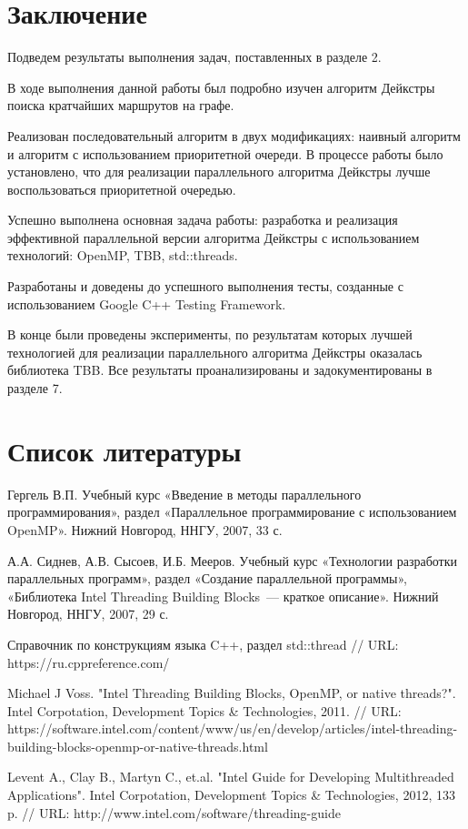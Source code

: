 \documentclass{article}
\begin{document}
\newpage

\section{Заключение}
Подведем результаты выполнения задач, поставленных в разделе 2.

\par В ходе выполнения данной работы был подробно изучен алгоритм Дейкстры поиска кратчайших маршрутов на графе. 

\par Реализован последовательный алгоритм в двух модификациях: наивный алгоритм и алгоритм с использованием приоритетной очереди. В процессе работы было установлено, что для реализации параллельного алгоритма Дейкстры лучше воспользоваться приоритетной очередью.

\par Успешно выполнена основная задача работы: разработка и реализация эффективной параллельной версии алгоритма Дейкстры с использованием технологий: OpenMP, TBB, std::threads.

\par Разработаны и доведены до успешного выполнения тесты, созданные с использованием Google C++ Testing Framework.

\par В конце были проведены эксперименты, по результатам которых  лучшей технологией для реализации параллельного алгоритма Дейкстры оказалась библиотека TBB. Все результаты проанализированы и задокументированы в разделе 7.

\newpage

\section{Список литературы}
\begin{enumerate}
 Гергель В.П. Учебный курс «Введение в методы параллельного программирования», раздел «Параллельное программирование с использованием OpenMP». Нижний Новгород, ННГУ, 2007, 33 с.

 А.А. Сиднев, А.В. Сысоев, И.Б. Мееров. Учебный курс «Технологии разработки параллельных программ», раздел «Создание параллельной программы», «Библиотека Intel Threading Building Blocks~--- краткое описание». Нижний Новгород, ННГУ, 2007, 29 с. 

 Справочник по конструкциям языка C++, раздел std::thread // URL: https://ru.cppreference.com/

 Michael J Voss. "Intel Threading Building Blocks, OpenMP, or native threads?". Intel Corpotation, Development Topics \& Technologies, 2011. // URL: \linebreak https://software.intel.com/content/www/us/en/develop/articles/intel-threading-building-blocks-openmp-or-native-threads.html

 Levent A., Clay B., Martyn C., et.al. "Intel Guide for Developing Multithreaded Applications". Intel Corpotation, Development Topics \& Technologies, 2012, 133 p. // URL: http://www.intel.com/software/threading-guide
\end{enumerate}
\end{document}
